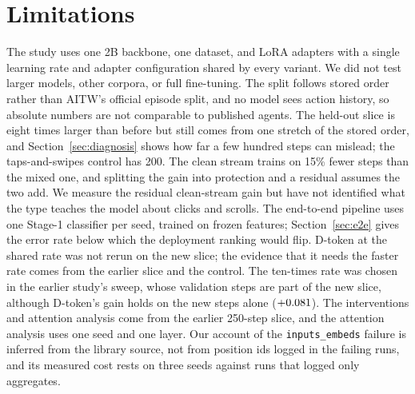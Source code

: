 \documentclass[letterpaper]{article} %
\begin{document}
\section{Limitations}
\label{sec:limitations}
The study uses one 2B backbone, one dataset, and LoRA adapters with a single learning rate and adapter configuration shared by every variant. We did not test larger models, other corpora, or full fine-tuning. The split follows stored order rather than AITW's official episode split, and no model sees action history, so absolute numbers are not comparable to published agents. The held-out slice is eight times larger than before but still comes from one stretch of the stored order, and Section~\ref{sec:diagnosis} shows how far a few hundred steps can mislead; the taps-and-swipes control has 200. The clean stream trains on 15\% fewer steps than the mixed one, and splitting the gain into protection and a residual assumes the two add. We measure the residual clean-stream gain but have not identified what the type teaches the model about clicks and scrolls. The end-to-end pipeline uses one Stage-1 classifier per seed, trained on frozen features; Section~\ref{sec:e2e} gives the error rate below which the deployment ranking would flip. D-token at the shared rate was not rerun on the new slice; the evidence that it needs the faster rate comes from the earlier slice and the control. The ten-times rate was chosen in the earlier study's sweep, whose validation steps are part of the new slice, although D-token's gain holds on the new steps alone ($+0.081$). The interventions and attention analysis come from the earlier 250-step slice, and the attention analysis uses one seed and one layer. Our account of the \texttt{inputs\_embeds} failure is inferred from the library source, not from position ids logged in the failing runs, and its measured cost rests on three seeds against runs that logged only aggregates.
\end{document}
